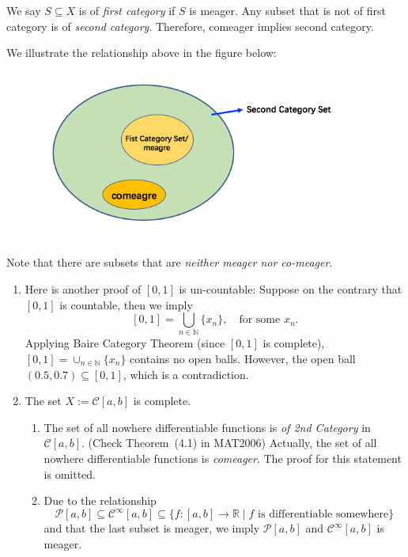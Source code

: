 \begin{remark}
We say $S\subseteq X$ is of \emph{first category} if $S$ is meager.
Any subset that is not of first category is of \emph{second category}.
Therefore, comeager implies second category.

We illustrate the relationship above in the figure below:
\begin{figure}[H]
\centering
\includegraphics[width=0.9\textwidth]{week5/p_4}
\end{figure}
Note that there are subsets that are \emph{neither meager nor co-meager}.
\end{remark}


\begin{example}
\begin{enumerate}
\item
Here is another proof of $[0,1]$ is un-countable: Suppose on the contrary that $[0,1]$ is countable, then we imply 
\[
[0,1] = \bigcup_{n\in\mathbb{N}}\{x_n\},\quad\text{for some $x_n$.}
\]
Applying Baire Category Theorem (since $[0,1]$ is complete), $[0,1] = \cup_{n\in\mathbb{N}}\{x_n\}$ contains no open balls. However, the open ball $(0.5,0.7)\subseteq[0,1]$, which is a contradiction.
\item
The set $X:=\mathcal{C}[a,b]$ is complete.
\begin{enumerate}
\item
The set of all nowhere differentiable functions is \emph{of 2nd Category} in $\mathcal{C}[a,b]$. (Check Theorem~(4.1) in MAT2006)
Actually, the set of all nowhere differentiable functions is \emph{comeager}. The proof for this statement is omitted.
\item
Due to the relationship 
\[
\mathcal{P}[a,b]\subseteq\mathcal{C}^\infty[a,b]\subseteq\{f:[a,b]\to\mathbb{R}\mid \text{$f$ is differentiable somewhere}\}
\]
and that the last subset is meager, we imply $\mathcal{P}[a,b]$ and $\mathcal{C}^\infty[a,b]$ is meager.
\end{enumerate}
\end{enumerate}
\end{example}

